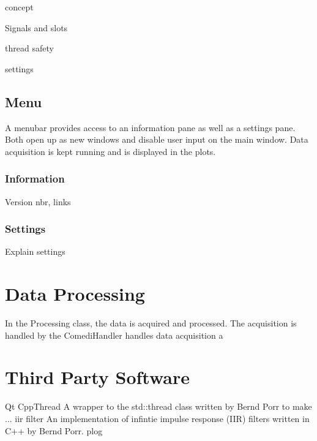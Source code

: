 concept

Signals and slots

thread safety

settings

\subsection{Menu}
A menubar provides access to an information pane as well as a settings pane. Both open up as new windows and disable user input on the main window. Data acquisition is kept running and is displayed in the plots. 

\subsubsection{Information}
Version nbr, links

\subsubsection{Settings}
Explain settings


\section{Data Processing}
In the Processing class, the data is acquired and processed. The acquisition is handled by the ComediHandler handles data acquisition a	

\section{Third Party Software}
Qt
CppThread A wrapper to the std::thread class written by Bernd Porr to make ...
iir filter An implementation of infintie impulse response (IIR) filters written in C++ by Bernd Porr.
plog 
